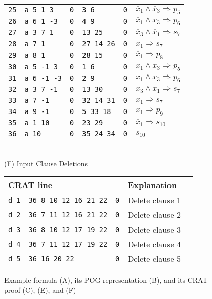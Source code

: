 \documentclass[letterpaper,USenglish,cleveref, autoref, thm-restate]{lipics-v2021}
\newcommand{\obar}[1]{\overline{#1}}
\newcommand{\imply}{\Rightarrow}
\begin{document}
\begin{figure}
\begin{minipage}{0.49\textwidth}
\begin{tabular}{llllll}
\midrule
\texttt{25} & \texttt{a 5 1 3} & \texttt{0} & \texttt{3 6} & \texttt{0} & $\obar{x}_1 \land \obar{x}_3 \imply p_5$ \\
\texttt{26} & \texttt{a 6 1 -3} & \texttt{0} & \texttt{4 9} & \texttt{0} & $\obar{x}_1 \land x_3 \imply p_6$ \\
\texttt{27} & \texttt{a 3 7 1} & \texttt{0} & \texttt{13 25} & \texttt{0} & $\obar{x}_3 \land \obar{x}_1 \imply s_7$  \\
\texttt{28} & \texttt{a 7 1} & \texttt{0} & \texttt{27 14 26} & \texttt{0} & $\obar{x}_1 \imply s_7$  \\
\texttt{29} & \texttt{a 8 1} & \texttt{0} & \texttt{28 15} & \texttt{0} & $\obar{x}_1 \imply p_8$  \\
\texttt{30} & \texttt{a 5 -1 3} & \texttt{0} & \texttt{1 6} & \texttt{0} & $x_1 \land \obar{x}_3 \imply p_5$ \\
\texttt{31} & \texttt{a 6 -1 -3} & \texttt{0} & \texttt{2 9} & \texttt{0} & $x_1 \land x_3 \imply p_6$ \\
\texttt{32} & \texttt{a 3 7 -1} & \texttt{0} & \texttt{13 30} & \texttt{0} & $\obar{x}_3 \land x_1 \imply s_7$  \\
\texttt{33} & \texttt{a 7 -1} & \texttt{0} & \texttt{32 14 31} & \texttt{0} & $x_1 \imply s_7$  \\
\texttt{34} & \texttt{a 9 -1} & \texttt{0} & \texttt{5 33 18} & \texttt{0} & $x_1 \imply p_9$  \\
\texttt{35} & \texttt{a 1 10} & \texttt{0} & \texttt{23 29} & \texttt{0} & $\obar{x}_1 \imply s_{10}$  \\
\texttt{36} & \texttt{a 10} & \texttt{0} & \texttt{35 24 34} & \texttt{0} & $s_{10}$ \\
\bottomrule
\end{tabular}
\\[1.5ex]
(F) Input Clause Deletions\\[1.2ex]
\begin{tabular}{lllll}
  \toprule
 \multicolumn{3}{l}{CRAT line} & Explanation\\
\midrule
 \texttt{d 1} & \texttt{36 8 10 12 16 21 22} & \texttt{0} & Delete clause 1 \\
 \texttt{d 2} & \texttt{36 7 11 12 16 21 22} & \texttt{0} & Delete clause 2 \\
 \texttt{d 3} & \texttt{36 8 10 12 17 19 22} & \texttt{0} & Delete clause 3 \\
 \texttt{d 4} & \texttt{36 7 11 12 17 19 22} & \texttt{0} & Delete clause 4 \\
 \texttt{d 5} & \texttt{36 16 20 22} & \texttt{0} &  Delete clause 5 \\
\bottomrule
\end{tabular}
\end{minipage}
\caption{Example formula (A), its POG representation (B), and its CRAT proof (C), (E), and (F)}
\label{fig:eg4:all}
\end{figure}
\end{document}
